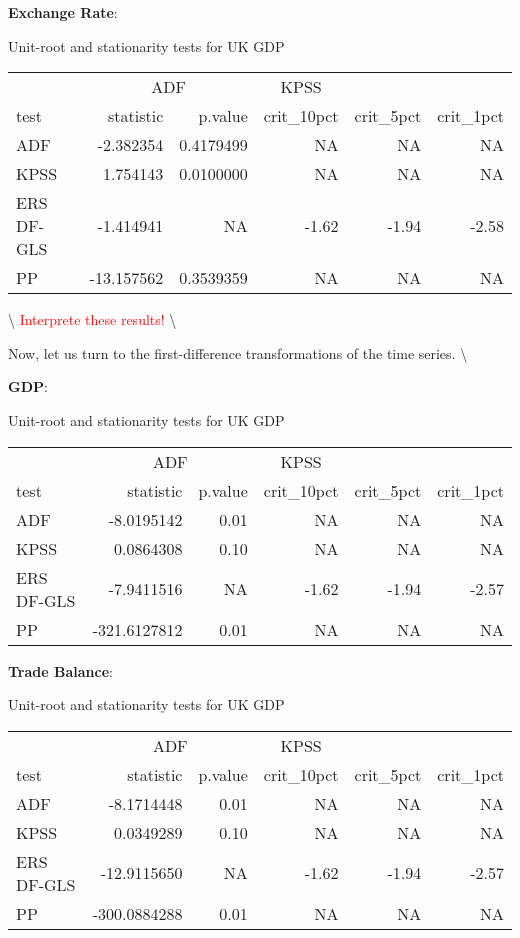 \documentclass[
]{article}
\begin{document}
\textbf{Exchange Rate}:

\bgroup \table[H]
\centering
\caption{\label{tab:unnamed-chunk-4}Unit-root and stationarity tests for UK GDP}
\centering
\begin{tabular}[t]{lrrrrr}
\toprule
\multicolumn{1}{c}{ } & \multicolumn{2}{c}{ADF} & \multicolumn{1}{c}{KPSS} \\
\cmidrule(l{3pt}r{3pt}){2-3} \cmidrule(l{3pt}r{3pt}){4-4}
test & statistic & p.value & crit\_10pct & crit\_5pct & crit\_1pct\\
\midrule
ADF & -2.382354 & 0.4179499 & NA & NA & NA\\
KPSS & 1.754143 & 0.0100000 & NA & NA & NA\\
ERS DF-GLS & -1.414941 & NA & -1.62 & -1.94 & -2.58\\
PP & -13.157562 & 0.3539359 & NA & NA & NA\\
\bottomrule
\end{tabular}
\endtable\egroup

\textbackslash{} \textcolor{red}{Interprete these results!}
\textbackslash{}

Now, let us turn to the first-difference transformations of the time
series. \textbackslash{}

\textbf{GDP}:

\bgroup \table[H]
\centering
\caption{\label{tab:unnamed-chunk-5}Unit-root and stationarity tests for UK GDP}
\centering
\begin{tabular}[t]{lrrrrr}
\toprule
\multicolumn{1}{c}{ } & \multicolumn{2}{c}{ADF} & \multicolumn{1}{c}{KPSS} \\
\cmidrule(l{3pt}r{3pt}){2-3} \cmidrule(l{3pt}r{3pt}){4-4}
test & statistic & p.value & crit\_10pct & crit\_5pct & crit\_1pct\\
\midrule
ADF & -8.0195142 & 0.01 & NA & NA & NA\\
KPSS & 0.0864308 & 0.10 & NA & NA & NA\\
ERS DF-GLS & -7.9411516 & NA & -1.62 & -1.94 & -2.57\\
PP & -321.6127812 & 0.01 & NA & NA & NA\\
\bottomrule
\end{tabular}
\endtable\egroup

\textbf{Trade Balance}:

\bgroup \table[H]
\centering
\caption{\label{tab:unnamed-chunk-6}Unit-root and stationarity tests for UK GDP}
\centering
\begin{tabular}[t]{lrrrrr}
\toprule
\multicolumn{1}{c}{ } & \multicolumn{2}{c}{ADF} & \multicolumn{1}{c}{KPSS} \\
\cmidrule(l{3pt}r{3pt}){2-3} \cmidrule(l{3pt}r{3pt}){4-4}
test & statistic & p.value & crit\_10pct & crit\_5pct & crit\_1pct\\
\midrule
ADF & -8.1714448 & 0.01 & NA & NA & NA\\
KPSS & 0.0349289 & 0.10 & NA & NA & NA\\
ERS DF-GLS & -12.9115650 & NA & -1.62 & -1.94 & -2.57\\
PP & -300.0884288 & 0.01 & NA & NA & NA\\
\bottomrule
\end{tabular}
\endtable\egroup
\end{document}
